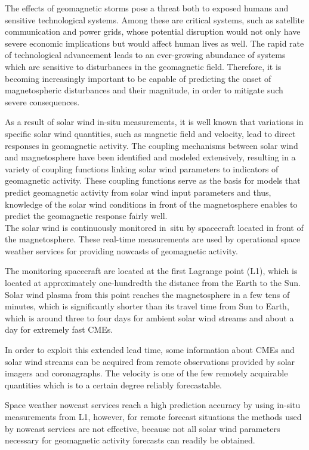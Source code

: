 The effects of geomagnetic storms pose a threat both to exposed humans and sensitive technological systems. Among these are critical systems, such as satellite communication and power grids, whose potential disruption would not only have severe economic implications but would affect human lives as well. The rapid rate of technological advancement leads to an ever-growing abundance of systems which are sensitive to disturbances in the geomagnetic field. Therefore, it is becoming increasingly important to be capable of predicting the onset of magnetospheric disturbances and their magnitude, in order to mitigate such severe consequences.

As a result of solar wind in-situ measurements, it is well known that variations in specific solar wind quantities, such as magnetic field and velocity, lead to direct responses in geomagnetic activity. The coupling mechanisms between solar wind and magnetosphere have been identified and modeled extensively, resulting in a variety of coupling functions linking solar wind parameters to indicators of geomagnetic activity. These coupling functions serve as the basis for models that predict geomagnetic activity from solar wind input parameters and thus, knowledge of the solar wind conditions in front of the magnetosphere enables to predict the geomagnetic response fairly well.\\

The solar wind is continuously monitored in~situ by spacecraft located in front of the magnetosphere. These real-time measurements are used by operational space weather services for providing nowcasts of geomagnetic activity.

The monitoring spacecraft are located at the first Lagrange point (L1), which is located at approximately one-hundredth the distance from the Earth to the Sun.
Solar wind plasma from this point reaches the magnetosphere in a few tens of minutes, which is significantly shorter than its  travel time from Sun to Earth, which is around three to four days for ambient solar wind streams and about a day for extremely fast CMEs.

In order to exploit this extended lead time, some information about CMEs and solar wind streams can be acquired from remote observations provided by solar imagers and coronagraphs. The velocity is one of the few remotely acquirable quantities which is to a certain degree reliably forecastable.

Space weather nowcast services reach a high prediction accuracy by using in-situ measurements from L1, however, for remote forecast situations the methods used by nowcast services are not effective, because not all solar wind parameters necessary for geomagnetic activity forecasts can readily be obtained.\\

